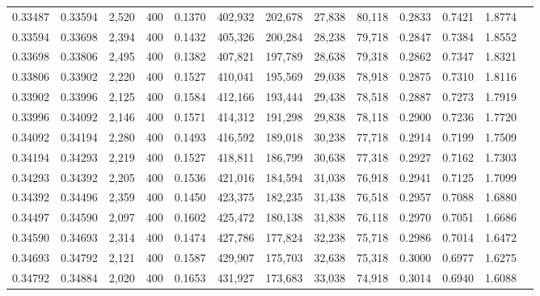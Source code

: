 \begin{tabular}{rrrrrrrrrrrrr}
0.33487 & 0.33594 &  2,520 &   400 &                                     0.1370 & 402,932 & 202,678 &  27,838 &  80,118 & 0.2833 & 0.7421 & 1.8774 \\
0.33594 & 0.33698 &  2,394 &   400 &                                     0.1432 & 405,326 & 200,284 &  28,238 &  79,718 & 0.2847 & 0.7384 & 1.8552 \\
0.33698 & 0.33806 &  2,495 &   400 &                                     0.1382 & 407,821 & 197,789 &  28,638 &  79,318 & 0.2862 & 0.7347 & 1.8321 \\
0.33806 & 0.33902 &  2,220 &   400 &                                     0.1527 & 410,041 & 195,569 &  29,038 &  78,918 & 0.2875 & 0.7310 & 1.8116 \\
0.33902 & 0.33996 &  2,125 &   400 &                                     0.1584 & 412,166 & 193,444 &  29,438 &  78,518 & 0.2887 & 0.7273 & 1.7919 \\
0.33996 & 0.34092 &  2,146 &   400 &                                     0.1571 & 414,312 & 191,298 &  29,838 &  78,118 & 0.2900 & 0.7236 & 1.7720 \\
0.34092 & 0.34194 &  2,280 &   400 &                                     0.1493 & 416,592 & 189,018 &  30,238 &  77,718 & 0.2914 & 0.7199 & 1.7509 \\
0.34194 & 0.34293 &  2,219 &   400 &                                     0.1527 & 418,811 & 186,799 &  30,638 &  77,318 & 0.2927 & 0.7162 & 1.7303 \\
0.34293 & 0.34392 &  2,205 &   400 &                                     0.1536 & 421,016 & 184,594 &  31,038 &  76,918 & 0.2941 & 0.7125 & 1.7099 \\
0.34392 & 0.34496 &  2,359 &   400 &                                     0.1450 & 423,375 & 182,235 &  31,438 &  76,518 & 0.2957 & 0.7088 & 1.6880 \\
0.34497 & 0.34590 &  2,097 &   400 &                                     0.1602 & 425,472 & 180,138 &  31,838 &  76,118 & 0.2970 & 0.7051 & 1.6686 \\
0.34590 & 0.34693 &  2,314 &   400 &                                     0.1474 & 427,786 & 177,824 &  32,238 &  75,718 & 0.2986 & 0.7014 & 1.6472 \\
0.34693 & 0.34792 &  2,121 &   400 &                                     0.1587 & 429,907 & 175,703 &  32,638 &  75,318 & 0.3000 & 0.6977 & 1.6275 \\
0.34792 & 0.34884 &  2,020 &   400 &                                     0.1653 & 431,927 & 173,683 &  33,038 &  74,918 & 0.3014 & 0.6940 & 1.6088 \\

\end{tabular}
